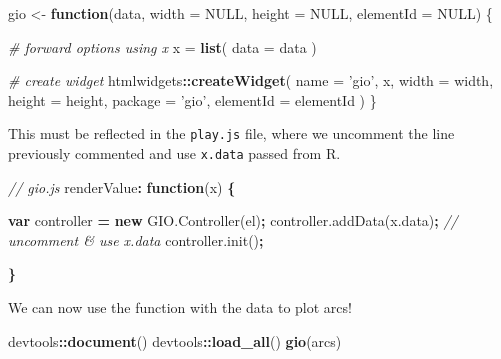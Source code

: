 \documentclass[10pt,]{krantz}
\makeatletter
\newenvironment{Shaded}{\begin{snugshade}}{\end{snugshade}}
\newcommand{\AttributeTok}[1]{\textcolor[rgb]{0.61,0.61,0.61}{#1}}
\newcommand{\CommentTok}[1]{\textcolor[rgb]{0.37,0.37,0.37}{\textit{#1}}}
\newcommand{\ControlFlowTok}[1]{\textcolor[rgb]{0.27,0.27,0.27}{\textbf{#1}}}
\newcommand{\DataTypeTok}[1]{\textcolor[rgb]{0.27,0.27,0.27}{#1}}
\newcommand{\KeywordTok}[1]{\textcolor[rgb]{0.27,0.27,0.27}{\textbf{#1}}}
\newcommand{\NormalTok}[1]{#1}
\newcommand{\OperatorTok}[1]{\textcolor[rgb]{0.43,0.43,0.43}{\textbf{#1}}}
\newcommand{\OtherTok}[1]{\textcolor[rgb]{0.37,0.37,0.37}{#1}}
\newcommand{\StringTok}[1]{\textcolor[rgb]{0.5,0.5,0.5}{#1}}
\newcommand{\VariableTok}[1]{\textcolor[rgb]{0,0,0}{#1}}
\newenvironment{kframe}{%
\medskip{}
\setlength{\fboxsep}{.8em}
 \def\at@end@of@kframe{}%
 \ifinner\ifhmode%
  \def\at@end@of@kframe{\end{minipage}}%
  \begin{minipage}{\columnwidth}%
 \fi\fi%
 \def\FrameCommand##1{\hskip\@totalleftmargin \hskip-\fboxsep
 \colorbox{shadecolor}{##1}\hskip-\fboxsep
     \hskip-\linewidth \hskip-\@totalleftmargin \hskip\columnwidth}%
 \MakeFramed {\advance\hsize-\width
   \@totalleftmargin\z@ \linewidth\hsize
   \@setminipage}}%
 {\par\unskip\endMakeFramed%
 \at@end@of@kframe}
\renewenvironment{Shaded}{\begin{kframe}}{\end{kframe}}
\makeatother
\begin{document}
\begin{Shaded}
\begin{Highlighting}[]
\NormalTok{gio <-}\StringTok{ }\ControlFlowTok{function}\NormalTok{(data, }\DataTypeTok{width =} \OtherTok{NULL}\NormalTok{, }\DataTypeTok{height =} \OtherTok{NULL}\NormalTok{, }\DataTypeTok{elementId =} \OtherTok{NULL}\NormalTok{) \{}

  \CommentTok{# forward options using x}
\NormalTok{  x =}\StringTok{ }\KeywordTok{list}\NormalTok{(}
    \DataTypeTok{data =}\NormalTok{ data}
\NormalTok{  )}

  \CommentTok{# create widget}
\NormalTok{  htmlwidgets}\OperatorTok{::}\KeywordTok{createWidget}\NormalTok{(}
    \DataTypeTok{name =} \StringTok{'gio'}\NormalTok{,}
\NormalTok{    x,}
    \DataTypeTok{width =}\NormalTok{ width,}
    \DataTypeTok{height =}\NormalTok{ height,}
    \DataTypeTok{package =} \StringTok{'gio'}\NormalTok{,}
    \DataTypeTok{elementId =}\NormalTok{ elementId}
\NormalTok{  )}
\NormalTok{\}}
\end{Highlighting}
\end{Shaded}

This must be reflected in the \texttt{play.js} file, where we uncomment the line previously commented and use \texttt{x.data} passed from R.

\begin{Shaded}
\begin{Highlighting}[]
\CommentTok{// gio.js}
\NormalTok{renderValue}\OperatorTok{:} \KeywordTok{function}\NormalTok{(x) }\OperatorTok{\{}

  \KeywordTok{var}\NormalTok{ controller }\OperatorTok{=} \KeywordTok{new} \VariableTok{GIO}\NormalTok{.}\AttributeTok{Controller}\NormalTok{(el)}\OperatorTok{;}
  \VariableTok{controller}\NormalTok{.}\AttributeTok{addData}\NormalTok{(}\VariableTok{x}\NormalTok{.}\AttributeTok{data}\NormalTok{)}\OperatorTok{;} \CommentTok{// uncomment & use x.data}
  \VariableTok{controller}\NormalTok{.}\AttributeTok{init}\NormalTok{()}\OperatorTok{;}

\OperatorTok{\}}
\end{Highlighting}
\end{Shaded}

We can now use the function with the data to plot arcs!

\begin{Shaded}
\begin{Highlighting}[]
\NormalTok{devtools}\OperatorTok{::}\KeywordTok{document}\NormalTok{()}
\NormalTok{devtools}\OperatorTok{::}\KeywordTok{load_all}\NormalTok{()}
\KeywordTok{gio}\NormalTok{(arcs)}
\end{Highlighting}
\end{Shaded}
\end{document}
